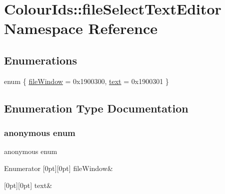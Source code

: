 \hypertarget{namespaceColourIds_1_1fileSelectTextEditor}{}\section{Colour\+Ids\+:\+:file\+Select\+Text\+Editor Namespace Reference}
\label{namespaceColourIds_1_1fileSelectTextEditor}
\subsection*{Enumerations}
\begin{DoxyCompactItemize}
\item 
enum \{ \mbox{\hyperlink{namespaceColourIds_1_1fileSelectTextEditor_a1f39b8696c4a453bb3a82e59c4828742a8a93c46b86828e1d16db502a3db72c8a}{file\+Window}} = 0x1900300, 
\mbox{\hyperlink{namespaceColourIds_1_1fileSelectTextEditor_a1f39b8696c4a453bb3a82e59c4828742ab71cc0dafdaea3c365bd15a546d92714}{text}} = 0x1900301
 \}
\end{DoxyCompactItemize}


\subsection{Enumeration Type Documentation}
\mbox{\label{namespaceColourIds_1_1fileSelectTextEditor_a1f39b8696c4a453bb3a82e59c4828742}} 
\subsubsection{\texorpdfstring{anonymous enum}{anonymous enum}}
{\footnotesize\ttfamily anonymous enum}

\begin{DoxyEnumFields}{Enumerator}
[0pt][0pt]{}\mbox{\label{namespaceColourIds_1_1fileSelectTextEditor_a1f39b8696c4a453bb3a82e59c4828742a8a93c46b86828e1d16db502a3db72c8a}} 
file\+Window&\\
\hline

[0pt][0pt]{}\mbox{\label{namespaceColourIds_1_1fileSelectTextEditor_a1f39b8696c4a453bb3a82e59c4828742ab71cc0dafdaea3c365bd15a546d92714}} 
text&\\
\hline

\end{DoxyEnumFields}
